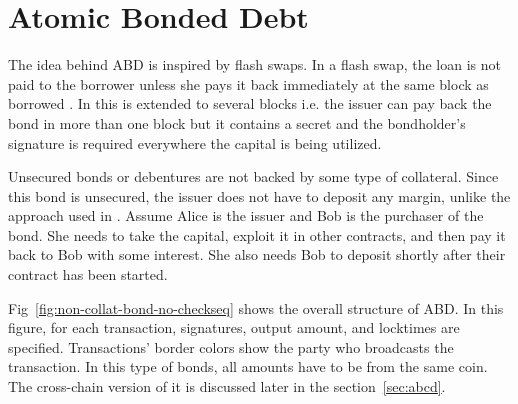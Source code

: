 \section{Atomic Bonded Debt}
\label{sec:abd}

The idea behind ABD is inspired by flash swaps. In a flash swap, the loan is not paid to the borrower unless she pays it back immediately at the same block as borrowed \cite{flashswaps}. In \abcd this is extended to several blocks i.e. the issuer can pay back the bond in more than one block but it contains a secret and the bondholder's signature is required everywhere the capital is being utilized. 

Unsecured bonds or debentures are not backed by some type of collateral. Since this bond is unsecured, the issuer does not have to deposit any margin, unlike the approach used in \cite{liu2018atomic}. Assume Alice is the issuer and Bob is the purchaser of the bond. She needs to take the capital, exploit it in other contracts, and then pay it back to Bob with some interest. She also needs Bob to deposit shortly after their contract has been started.

Fig~\ref{fig:non-collat-bond-no-checkseq} shows the overall structure of ABD. In this figure, for each transaction, signatures, output amount, and locktimes are specified. Transactions' border colors show the party who broadcasts the transaction. In this type of bonds, all amounts have to be from the same coin. The cross-chain version of it is discussed later in the section~\ref{sec:abcd}.

